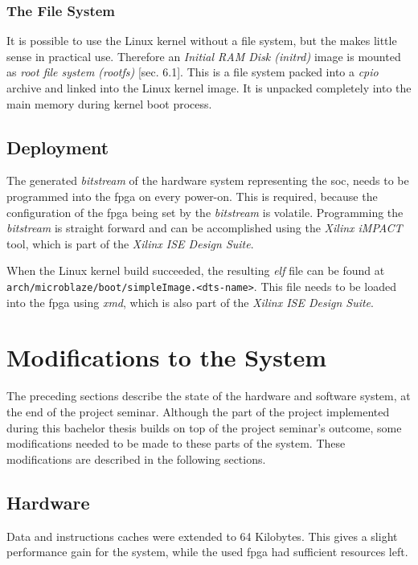 \subsection{The File System}
\label{subsec:fs}

It is possible to use the Linux kernel without a file system, but the makes little sense in practical use. Therefore an \textit{Initial RAM Disk (initrd)} image is mounted as \textit{root file system (rootfs)} \cite{linuxPrimer}[sec. 6.1]. This is a file system packed into a \textit{cpio} archive and linked into the Linux kernel image. It is unpacked completely into the main memory during kernel boot process.

\section{Deployment}

The generated \textit{bitstream} of the hardware system representing the \gls{soc}, needs to be programmed into the \gls{fpga} on every power-on. This is required, because the configuration of the \gls{fpga} being set by the \textit{bitstream} is volatile. Programming the \textit{bitstream} is straight forward and can be accomplished using the \textit{Xilinx iMPACT} tool, which is part of the \textit{Xilinx ISE Design Suite}.

When the Linux kernel build succeeded, the resulting \textit{\gls{elf}} file can be found at \texttt{arch/microblaze/boot/simpleImage.<dts-name>}. This file needs to be loaded into the \gls{fpga} using \textit{\gls{xmd}}, which is also part of the \textit{Xilinx ISE Design Suite}.

\chapter{Modifications to the System}

The preceding sections describe the state of the hardware and software system, at the end of the project seminar. Although the part of the project implemented during this bachelor thesis builds on top of the project seminar's outcome, some modifications needed to be made to these parts of the system. These modifications are described in the following sections.

\section{Hardware}

Data and instructions caches were extended to 64 Kilobytes. This gives a slight performance gain for the system, while the used \gls{fpga} had sufficient resources left.

